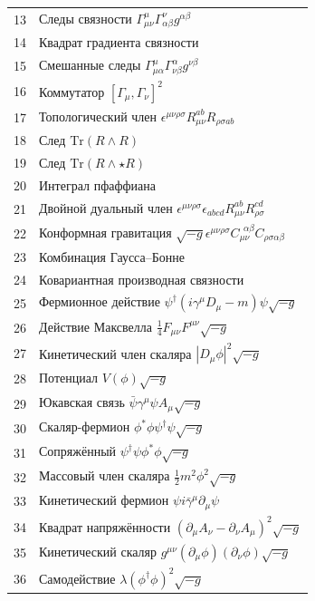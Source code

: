 \documentclass[12pt,a4paper]{article}
\begin{document}
\begin{longtable}{r l}
		13 & Следы связности \(\Gamma^{\mu}_{\mu\nu}\Gamma^{\nu}_{\alpha\beta}g^{\alpha\beta}\) \\
		14 & Квадрат градиента связности \\
		15 & Смешанные следы \(\Gamma^{\mu}_{\mu\alpha}\Gamma^{\alpha}_{\nu\beta}g^{\nu\beta}\) \\
		16 & Коммутатор \([\Gamma_\mu, \Gamma_\nu]^2\) \\
		17 & Топологический член \(\epsilon^{\mu\nu\rho\sigma}R_{\mu\nu}^{ab}R_{\rho\sigma ab}\) \\
		18 & След \(\mathrm{Tr}(R\wedge R)\) \\
		19 & След \(\mathrm{Tr}(R\wedge\star R)\) \\
		20 & Интеграл пфаффиана \\
		21 & Двойной дуальный член \(\epsilon^{\mu\nu\rho\sigma}\epsilon_{abcd}R_{\mu\nu}^{ab}R_{\rho\sigma}^{cd}\) \\
		22 & Конформная гравитация \(\sqrt{-g}\epsilon^{\mu\nu\rho\sigma}C_{\mu\nu}^{\ \ \alpha\beta}C_{\rho\sigma\alpha\beta}\) \\
		23 & Комбинация Гаусса--Бонне \\
		24 & Ковариантная производная связности \\
		25 & Фермионное действие \(\psi^\dagger(i\gamma^\mu D_\mu - m)\psi\sqrt{-g}\) \\
		26 & Действие Максвелла \(\frac{1}{4}F_{\mu\nu}F^{\mu\nu}\sqrt{-g}\) \\
		27 & Кинетический член скаляра \(|D_\mu\phi|^2\sqrt{-g}\) \\
		28 & Потенциал \(V(\phi)\sqrt{-g}\) \\
		29 & Юкавская связь \(\bar{\psi}\gamma^\mu\psi A_\mu\sqrt{-g}\) \\
		30 & Скаляр-фермион \(\phi^*\phi\psi^\dagger\psi\sqrt{-g}\) \\
		31 & Сопряжённый \(\psi^\dagger\psi\phi^*\phi\sqrt{-g}\) \\
		32 & Массовый член скаляра \(\frac{1}{2}m^2\phi^2\sqrt{-g}\) \\
		33 & Кинетический фермион \(\psi i\bar{\gamma}^\mu\partial_\mu\psi\) \\
		34 & Квадрат напряжённости \((\partial_\mu A_\nu - \partial_\nu A_\mu)^2\sqrt{-g}\) \\
		35 & Кинетический скаляр \(g^{\mu\nu}(\partial_\mu\phi)(\partial_\nu\phi)\sqrt{-g}\) \\
		36 & Самодействие \(\lambda(\phi^\dagger\phi)^2\sqrt{-g}\) \\

\end{longtable}
\end{document}
